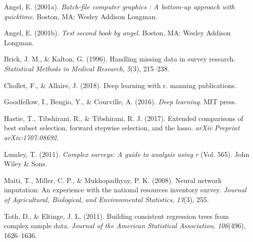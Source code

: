 \documentclass[12pt,twoside]{reedthesis}
\begin{document}
\hypertarget{ref-angel2001}{}
Angel, E. (2001a). \emph{Batch-file computer graphics : A bottom-up
approach with quicktime}. Boston, MA: Wesley Addison Longman.

\hypertarget{ref-angel2002a}{}
Angel, E. (2001b). \emph{Test second book by angel}. Boston, MA: Wesley
Addison Longman.

\hypertarget{ref-brick1996handling}{}
Brick, J. M., \& Kalton, G. (1996). Handling missing data in survey
research. \emph{Statistical Methods in Medical Research}, \emph{5}(3),
215--238.

\hypertarget{ref-chollet2018deep}{}
Chollet, F., \& Allaire, J. (2018). Deep learning with r. manning
publications.

\hypertarget{ref-goodfellow2016deep}{}
Goodfellow, I., Bengio, Y., \& Courville, A. (2016). \emph{Deep
learning}. MIT press.

\hypertarget{ref-hastie2017extended}{}
Hastie, T., Tibshirani, R., \& Tibshirani, R. J. (2017). Extended
comparisons of best subset selection, forward stepwise selection, and
the lasso. \emph{arXiv Preprint arXiv:1707.08692}.

\hypertarget{ref-lumley2011complex}{}
Lumley, T. (2011). \emph{Complex surveys: A guide to analysis using r}
(Vol. 565). John Wiley \& Sons.

\hypertarget{ref-maiti2008neural}{}
Maiti, T., Miller, C. P., \& Mukhopadhyay, P. K. (2008). Neural network
imputation: An experience with the national resources inventory survey.
\emph{Journal of Agricultural, Biological, and Environmental
Statistics}, \emph{13}(3), 255.

\hypertarget{ref-toth2011building}{}
Toth, D., \& Eltinge, J. L. (2011). Building consistent regression trees
from complex sample data. \emph{Journal of the American Statistical
Association}, \emph{106}(496), 1626--1636.


\end{document}
